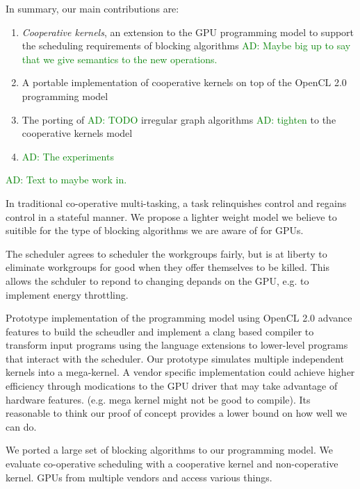 \documentclass[nocopyrightspace]{sigplanconf-pldi16}
\newcommand{\ADComment}[1]{\textcolor{green}{AD: #1}}
\begin{document}
In summary, our main contributions are:

\begin{enumerate}

\item \emph{Cooperative kernels}, an extension to the GPU programming model to support the scheduling requirements of blocking algorithms  \ADComment{Maybe big up to say that we give semantics to the new operations.}

\item A portable implementation of cooperative kernels on top of the OpenCL 2.0 programming model

\item The porting of \ADComment{TODO} irregular graph algorithms \ADComment{tighten} to the cooperative kernels model

\item \ADComment{The experiments}

\end{enumerate}

\ADComment{Text to maybe work in.}

In traditional co-operative multi-tasking, a task relinquishes control
and regains control in a stateful manner. We propose a lighter weight
model we believe to suitible for the type of blocking algorithms we
are aware of for GPUs.

The scheduler agrees to scheduler the workgroups fairly, but is at
liberty to eliminate workgroups for good when they offer themselves
to be killed. This allows the schduler to repond to changing depands
on the GPU, e.g. to implement energy throttling.

Prototype implementation of the programming model using OpenCL 2.0
advance features to build the scheudler and implement a clang based
compiler to transform input programs using the language extensions to
lower-level programs that interact with the scheduler. Our prototype
simulates multiple independent kernels into a mega-kernel. A vendor
specific implementation could achieve higher efficiency through
modications to the GPU driver that may take advantage of hardware
features. (e.g. mega kernel might not be good to compile). Its
reasonable to think our proof of concept provides a lower bound on how
well we can do.

We ported a large set of blocking algorithms to our programming
model. We evaluate co-operative scheduling with a cooperative kernel
and non-coperative kernel. GPUs from multiple vendors and access
various things.
\end{document}
